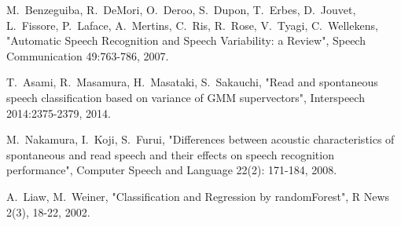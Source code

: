 \documentclass[conference]{IEEEtran}
\begin{document}
\begin{thebibliography}{1}
M.~Benzeguiba, R.~DeMori, O.~Deroo, S.~Dupon, T.~Erbes, D.~Jouvet, L.~Fissore, P.~Laface, A.~Mertins, C.~Ris, R.~Rose, V.~Tyagi, C.~Wellekens,
	"Automatic Speech Recognition and Speech Variability: a Review",
	Speech Communication 49:763-786, 2007.

T.~Asami, R.~Masamura, H.~Masataki, S.~Sakauchi,
    "Read and spontaneous speech classification based on variance of GMM supervectors",
	Interspeech 2014:2375-2379, 2014.

M.~Nakamura, I.~Koji, S.~Furui,
    "Differences between acoustic characteristics of spontaneous and read speech and their effects on speech recognition performance",
    Computer Speech and Language 22(2): 171-184, 2008.

A.~Liaw, M.~Weiner,
    "Classification and Regression by randomForest",
    R News 2(3), 18-22, 2002.

\end{thebibliography}




%
%

\end{document}
